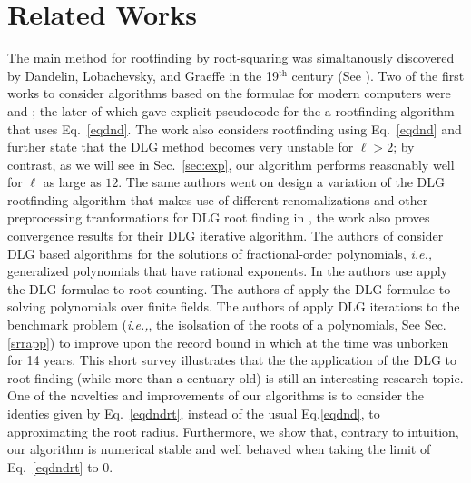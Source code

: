 \documentclass[sigconf]{acmart}
\begin{document}
\section{Related Works}
The main method for rootfinding by root-squaring was simaltanously discovered by Dandelin, Lobachevsky, and Graeffe in the 19$^\mathrm{th}$ century (See \cite{10.2307/2310626}). Two of the first works to consider algorithms based on the formulae for modern computers were \cite{10.1145/321186.321198} and \cite{10.1145/364955.364974}; the later of which gave explicit pseudocode for the a rootfinding algorithm that uses Eq.~\ref{eqdnd}.
The work \cite{Malajovich2001OnTG} also considers rootfinding using Eq.~\ref{eqdnd} and further state that the DLG method becomes very unstable for $\ell > 2$; by contrast, as we will see in Sec.~\ref{sec:exp}, our algorithm performs reasonably well for $\ell$ as large as $12$.
The same authors went on design a variation of the DLG rootfinding algorithm that makes use of different renomalizations and other preprocessing tranformations for DLG root finding in \cite{Malajovich2001TangentGI}, the work also proves convergence results for their DLG iterative algorithm.
The authors of \cite{Bialas2010GeneralizationOV} consider DLG based algorithms for the solutions of fractional-order polynomials, \emph{i.e.,} generalized polynomials that have rational exponents. In \cite{Hoeven2011EfficientRC} the authors use apply the DLG formulae to root counting.
The authors of \cite{Grenet2015DeterministicRF} apply the DLG formulae to solving polynomials over finite fields. The authors of \cite{Becker2018ANS} apply DLG iterations to the benchmark problem (\emph{i.e.,}, the isolsation of the roots of a polynomials, See Sec.\ref{srrapp}) to improve upon the record bound in \cite{pan2002univariate} which at the time was unborken for 14 years.
This short survey illustrates that the the application of the DLG to root finding (while more than a centuary old) is still an interesting research topic.
One of the novelties and improvements of our algorithms is to consider the identies given by Eq.~\ref{eqdndrt}, instead of the usual Eq.\ref{eqdnd}, to approximating the root radius.
Furthermore, we show that, contrary to intuition, our algorithm is numerical stable and well behaved when taking the limit of Eq.~\ref{eqdndrt} to 0.
\end{document}
